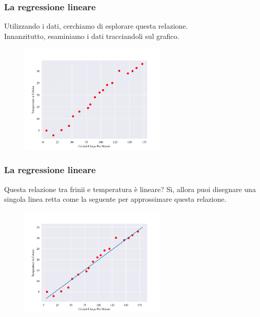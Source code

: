 \begin{frame}

	\frametitle{La regressione lineare}

	\begin{block}{}
		Utilizzando i dati, cerchiamo di esplorare questa relazione.\\
		Innanzitutto, esaminiamo i dati tracciandoli sul grafico.

		\begin{figure}[!htbp]
			\centering
			\includegraphics[width=7cm]{images/supervised/linear_regression/CricketPoints.pdf}
		\end{figure}
	\end{block}

\end{frame}


\begin{frame}

	\frametitle{La regressione lineare}

	\begin{block}{}
		Questa relazione tra frinii e temperatura è lineare? Sì, allora puoi disegnare una singola linea retta come la seguente per approssimare questa relazione.

		\begin{figure}[!htbp]
			\centering
			\includegraphics[width=7cm]{images/supervised/linear_regression/CricketLine.pdf}
		\end{figure}
	\end{block}

\end{frame}


